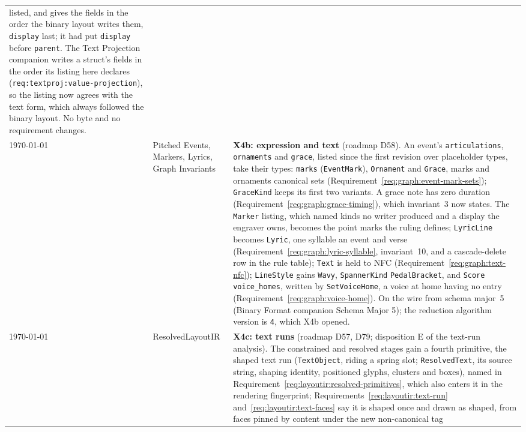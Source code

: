\documentclass[11pt,letterpaper]{report}
\newcommand{\sectionsc}[1]{{\addfontfeatures{Letters=SmallCaps}#1}}
\newcounter{requirement}[chapter]
\begin{document}
\begin{longtable}{p{2cm} p{2.5cm} p{9cm}}
  listed, and gives the fields in the order the binary layout writes them,
  \texttt{display} last; it had put \texttt{display} before
  \texttt{parent}. The Text Projection companion writes a struct's fields in
  the order its listing here declares (\texttt{req:textproj:value-projection}),
  so the listing now agrees with the text form, which always followed the
  binary layout. No byte and no requirement changes.
  \\
  \today & \sectionsc{Pitched Events}, \sectionsc{Markers},
  \sectionsc{Lyrics}, \sectionsc{Graph Invariants} &
  \textbf{X4b: expression and text} (roadmap D58). An event's
  \texttt{articulations}, \texttt{ornaments} and \texttt{grace}, listed
  since the first revision over placeholder types, take their types:
  \texttt{marks} (\texttt{EventMark}), \texttt{Ornament} and \texttt{Grace},
  marks and ornaments canonical sets
  (Requirement~\ref{req:graph:event-mark-sets}); \texttt{GraceKind} keeps
  its first two variants. A grace note has zero duration
  (Requirement~\ref{req:graph:grace-timing}), which invariant~3 now states.
  The \texttt{Marker} listing, which named kinds no writer produced and a
  display the engraver owns, becomes the point marks the ruling defines;
  \texttt{LyricLine} becomes \texttt{Lyric}, one syllable an event and verse
  (Requirement~\ref{req:graph:lyric-syllable}, invariant~10, and a
  cascade-delete row in the rule table); \texttt{Text} is held to NFC
  (Requirement~\ref{req:graph:text-nfc}); \texttt{LineStyle} gains
  \texttt{Wavy}, \texttt{SpannerKind} \texttt{PedalBracket}, and
  \texttt{Score} \texttt{voice\_homes}, written by \texttt{SetVoiceHome},
  a voice at home having no entry (Requirement~\ref{req:graph:voice-home}). On
  the wire from schema major~5 (Binary Format companion
  \sectionsc{Schema Major 5}); the reduction algorithm version is
  \texttt{4}, which X4b opened.
  \\
  \today & \sectionsc{ResolvedLayoutIR} &
  \textbf{X4c: text runs} (roadmap D57, D79; disposition E of the
  text-run analysis). The constrained and resolved stages gain a fourth
  primitive, the shaped text run (\texttt{TextObject}, riding a spring
  slot; \texttt{ResolvedText}, its source string, shaping identity,
  positioned glyphs, clusters and boxes), named in
  Requirement~\ref{req:layoutir:resolved-primitives}, which also enters
  it in the rendering fingerprint; Requirements~\ref{req:layoutir:text-run}
  and~\ref{req:layoutir:text-faces} say it is shaped once and drawn as
  shaped, from faces pinned by content under the new non-canonical tag

\end{longtable}
\end{document}
